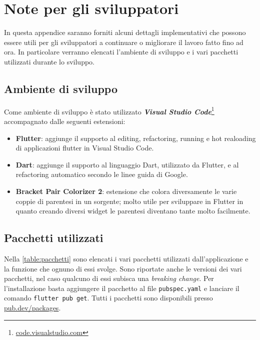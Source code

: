 \chapter{Note per gli sviluppatori}
In questa appendice saranno forniti alcuni dettagli implementativi che possono essere utili per gli sviluppatori a continuare o migliorare il lavoro fatto fino ad ora. In particolare verranno elencati l'ambiente di sviluppo e i vari pacchetti utilizzati durante lo sviluppo.

\section{Ambiente di sviluppo}
Come ambiente di sviluppo è stato utilizzato \textbf{\textit{Visual Studio Code}}\footnote{\url{code.visualstudio.com}} accompagnato dalle seguenti estensioni:
\begin{itemize}
\item \textbf{Flutter}: aggiunge il supporto al editing, refactoring, running e hot realoading di applicazioni flutter in Visual Studio Code.
\item \textbf{Dart}: aggiunge il supporto al linguaggio Dart, utilizzato da Flutter, e al refactoring automatico secondo le linee guida di Google.
\item \textbf{Bracket Pair Colorizer 2}: estensione che colora diversamente le varie coppie di parentesi in un sorgente; molto utile per sviluppare in Flutter in quanto creando diversi widget le parentesi diventano tante molto facilmente.
\end{itemize}

\section{Pacchetti utilizzati}
Nella \autoref{table:pacchetti} sono elencati i vari pacchetti utilizzati dall'applicazione e la funzione che ognuno di essi svolge. Sono riportate anche le versioni dei vari pacchetti, nel caso qualcuno di essi subisca una \textit{breaking change}. Per l'installazione basta aggiungere il pacchetto al file \texttt{pubspec.yaml} e lanciare il comando \texttt{flutter pub get}. Tutti i pacchetti sono disponibili presso \url{pub.dev/packages}.

